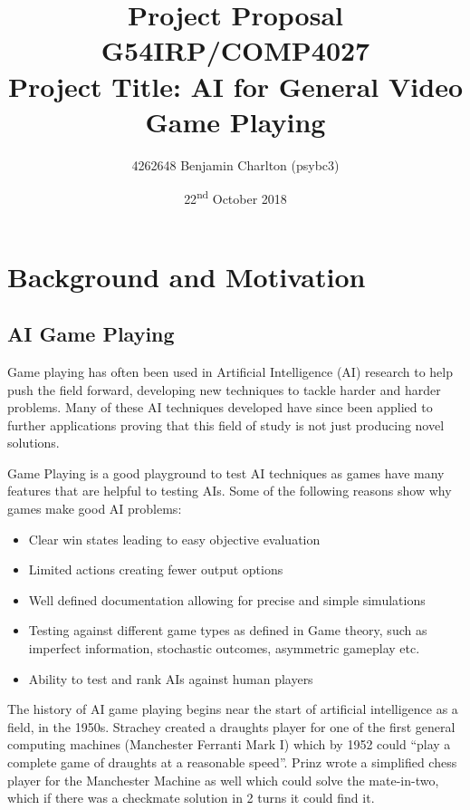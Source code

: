 \documentclass[a4paper]{article}
\begin{document}
\title{
    Project Proposal
    \\ \large{G54IRP/COMP4027}
    \\ \large{Project Title: AI for General Video Game Playing}\vspace{-3ex}}
\author{4262648 Benjamin Charlton (psybc3)}
\date{\vspace{-2ex}22\textsuperscript{nd} October 2018}
\maketitle

\section{Background and Motivation}
\subsection{AI Game Playing}
Game playing has often been used in Artificial Intelligence (AI) research to help push the field forward, developing new techniques to tackle harder and harder problems.
Many of these AI techniques developed have since been applied to further applications proving that this field of study is not just producing novel solutions.
\par
Game Playing is a good playground to test AI techniques as games have many features that are helpful to testing AIs.
Some of the following reasons show why games make good AI problems:
\begin{itemize}[noitemsep,nolistsep,leftmargin=*]
  \item Clear win states leading to easy objective evaluation
  \item Limited actions creating fewer output options
  \item Well defined documentation allowing for precise and simple simulations
  \item Testing against different game types as defined in Game theory, such as imperfect information, stochastic outcomes, asymmetric gameplay etc.
  \item Ability to test and rank AIs against human players
\end{itemize}
\par
The history of AI game playing begins near the start of artificial intelligence as a field, in the 1950s.
Strachey created a draughts player for one of the first general computing machines (Manchester Ferranti Mark I) which by  1952 could ``play a complete game of draughts at a reasonable speed''\cite{BreifHistoryComputing}.
Prinz wrote a simplified chess player for the Manchester Machine as well which could solve the mate-in-two, which if there was a checkmate solution in 2 turns it could find it\cite{BreifHistoryComputing}.
\end{document}
